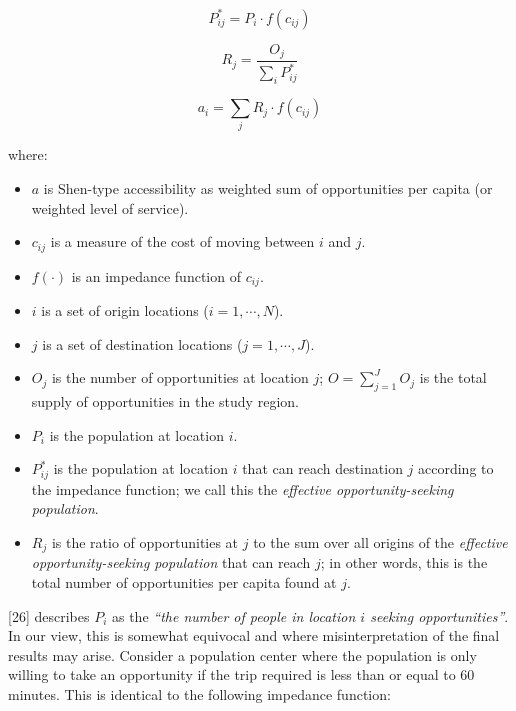 \documentclass[10pt,letterpaper]{article}
\providecommand{\tightlist}{%
  \setlength{\itemsep}{0pt}\setlength{\parskip}{0pt}}
\begin{document}
\begin{equation}
\label{eq:effective-opportunity-seeking-population}
P_{ij}^{*} = {P_{i} \cdot f(c_{ij})}
\end{equation}

\begin{equation}
\label{eq:level-of-service}
R_{j} = \frac{O_{j}}{\sum_i P_{ij}^*}
\end{equation}

\begin{equation}
\label{eq:2SFCA-step2}
a_{i} = {\sum_j R_{j} \cdot f(c_{ij})}
\end{equation}

\noindent where:

\begin{itemize}
\tightlist
\item
  \(a\) is Shen-type accessibility as weighted sum of opportunities per
  capita (or weighted level of service).
\item
  \(c_{ij}\) is a measure of the cost of moving between \(i\) and \(j\).
\item
  \(f(\cdot)\) is an impedance function of \(c_{ij}\).
\item
  \(i\) is a set of origin locations (\(i = 1,\cdots,N\)).
\item
  \(j\) is a set of destination locations (\(j = 1,\cdots,J\)).
\item
  \(O_j\) is the number of opportunities at location \(j\);
  \(O = \sum_{j=1}^J O_j\) is the total supply of opportunities in the
  study region.
\item
  \(P_i\) is the population at location \(i\).
\item
  \(P_{ij}^*\) is the population at location \(i\) that can reach
  destination \(j\) according to the impedance function; we call this
  the \emph{effective opportunity-seeking population}.
\item
  \(R_j\) is the ratio of opportunities at \(j\) to the sum over all
  origins of the \emph{effective opportunity-seeking population} that
  can reach \(j\); in other words, this is the total number of
  opportunities per capita found at \(j\).
\end{itemize}

{[}26{]} describes \(P_i\) as the \emph{``the number of people in
location \(i\) seeking opportunities''}. In our view, this is somewhat
equivocal and where misinterpretation of the final results may arise.
Consider a population center where the population is only willing to
take an opportunity if the trip required is less than or equal to 60
minutes. This is identical to the following impedance function:
\end{document}

